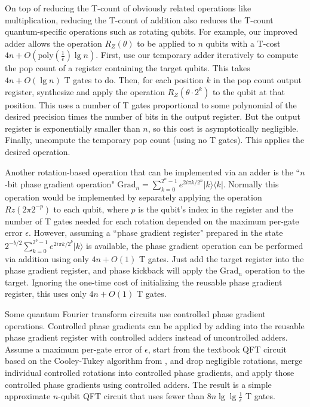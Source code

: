 \documentclass[twocolumn,longbibliography]{quantumarticle-customized}
\begin{document}
On top of reducing the T-count of obviously related operations like multiplication, reducing the T-count of addition also reduces the T-count quantum-specific operations such as rotating qubits.
For example, our improved adder allows the operation $R_Z(\theta)$ to be applied to $n$ qubits with a T-cost $4n + O(\text{poly}(\frac{1}{\epsilon}) \lg n)$.
First, use our temporary adder iteratively to compute the pop count of a register containing the target qubits.
This takes $4n + O(\lg n)$ T gates to do.
Then, for each position $k$ in the pop count output register, synthesize and apply the operation $R_Z(\theta \cdot 2^k)$ to the qubit at that position.
This uses a number of T gates proportional to some polynomial of the desired precision times the number of bits in the output register.
But the output register is exponentially smaller than $n$, so this cost is asymptotically negligible.
Finally, uncompute the temporary pop count (using no T gates).
This applies the desired operation.

Another rotation-based operation that can be implemented via an adder is the ``$n$-bit phase gradient operation" $\text{Grad}_n = \sum_{k=0}^{2^n-1} e^{2 i \pi k / 2^n} |k\rangle \langle k|$.
Normally this operation would be implemented by separately applying the operation $Rz(2 \pi 2^{-p})$ to each qubit, where $p$ is the qubit's index in the register and the number of T gates needed for each rotation depended on the maximum per-gate error $\epsilon$.
However, assuming a ``phase gradient register" prepared in the state $2^{-b/2} \sum_{k=0}^{2^b-1} e^{2 i \pi k / 2^b} |k\rangle$ is available, the phase gradient operation can be performed via addition using only $4n + O(1)$ T gates.
Just add the target register into the phase gradient register, and phase kickback will apply the $\text{Grad}_n$ operation to the target.
Ignoring the one-time cost of initializing the reusable phase gradient register, this uses only $4n + O(1)$ T gates.

Some quantum Fourier transform circuits use controlled phase gradient operations.
Controlled phase gradients can be applied by adding into the reusable phase gradient register with controlled adders instead of uncontrolled adders.
Assume a maximum per-gate error of $\epsilon$, start from the textbook QFT circuit based on the Cooley-Tukey algorithm from \cite{Nielsen2009}, and drop negligible rotations, merge individual controlled rotations into controlled phase gradients, and apply those controlled phase gradients using controlled adders.
The result is a simple approximate $n$-qubit QFT circuit that uses fewer than $8 n \lg \lg \frac{1}{\epsilon}$ T gates.
\end{document}
